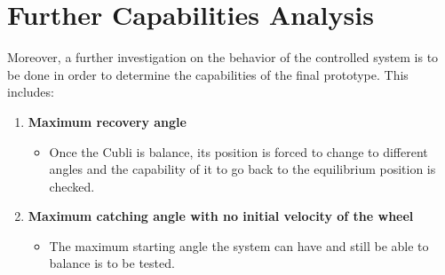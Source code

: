 \section{Further Capabilities Analysis}\label{title}
Moreover, a further investigation on the behavior of the controlled system is to be done in order to determine the capabilities of the final prototype. This includes:
\begin{enumerate}
%
	\item \textbf{Maximum recovery angle}
	\begin{itemize}
		\item[] Once the Cubli is balance, its position is forced to change to different angles and the capability of it to go back to the equilibrium position is checked. 
	\end{itemize}
	
	\item \textbf{Maximum catching angle with no initial velocity of the wheel}
	\begin{itemize}
		\item[] The maximum starting angle the system can have and still be able to balance is to be tested.\\
	\end{itemize}
	
\end{enumerate}